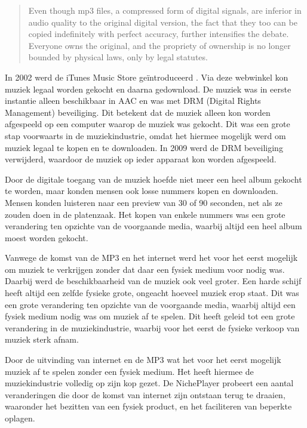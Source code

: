 \begin{quotation}
    Even though mp3 files, a compressed form of digital signals, are inferior in audio quality to the original digital version, the fact that they too can be copied indefinitely with perfect accuracy, further intensifies the debate. Everyone owns the original, and the propriety of ownership is no longer bounded by physical laws, only by legal statutes.
    \citep{lansky2004importance}
\end{quotation}

In 2002 werd de iTunes Music Store geïntroduceerd \citep{chen2010itunes}. Via deze webwinkel kon muziek legaal worden gekocht en daarna gedownload. De muziek was in eerste instantie alleen beschikbaar in AAC en was met DRM (Digital Rights Management) beveiliging. Dit betekent dat de muziek alleen kon worden afgespeeld op een computer waarop de muziek was gekocht. Dit was een grote stap voorwaarts in de muziekindustrie, omdat het hiermee mogelijk werd om muziek legaal te kopen en te downloaden. In 2009 werd de DRM beveiliging verwijderd, waardoor de muziek op ieder apparaat kon worden afgespeeld.

Door de digitale toegang van de muziek hoefde niet meer een heel album gekocht te worden, maar konden mensen ook losse nummers kopen en downloaden. Mensen konden luisteren naar een preview van 30 of 90 seconden, net als ze zouden doen in de platenzaak. Het kopen van enkele nummers was een grote verandering ten opzichte van de voorgaande media, waarbij altijd een heel album moest worden gekocht.

Vanwege de komst van de MP3 en het internet werd het voor het eerst mogelijk om muziek te verkrijgen zonder dat daar een fysiek medium voor nodig was. Daarbij werd de beschikbaarheid van de muziek ook veel groter. Een harde schijf heeft altijd een zelfde fysieke grote, ongeacht hoeveel muziek erop staat. Dit was een grote verandering ten opzichte van de voorgaande media, waarbij altijd een fysiek medium nodig was om muziek af te spelen. Dit heeft geleid tot een grote verandering in de muziekindustrie, waarbij voor het eerst de fysieke verkoop van muziek sterk afnam.

Door de uitvinding van internet en de MP3 wat het voor het eerst mogelijk muziek af te spelen zonder een fysiek medium. Het heeft hiermee de muziekindustrie volledig op zijn kop gezet. De NichePlayer probeert een aantal veranderingen die door de komst van internet zijn ontstaan terug te draaien, waaronder het bezitten van een fysiek product, en het faciliteren van beperkte oplagen.

